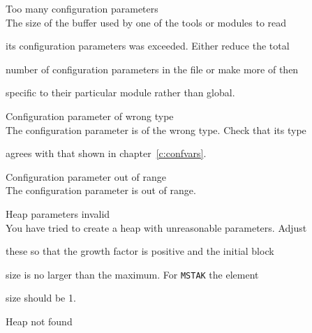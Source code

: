 \begin{itemize}
\begin{itemize}
    Too many configuration parameters\\


        The size of the buffer used by one of the tools or modules to read


        its configuration parameters was exceeded.  Either reduce the total


        number of configuration parameters in the file or make more of then


        specific to their particular module rather than global.





    Configuration parameter of wrong type\\


        The configuration parameter is of the wrong type.  Check that its type 


        agrees with that shown in chapter~\ref{c:confvars}.





    Configuration parameter out of range\\


        The configuration parameter is out of range.  





\end{itemize}










\begin{itemize}


    Heap parameters invalid\\


        You have tried to create a heap with unreasonable parameters.  Adjust 


        these so that the growth factor is positive and the initial block 


        size is no larger than the maximum.  For \texttt{MSTAK} the element 


        size should be 1.





    Heap not found\\



\end{itemize}
\end{itemize}
